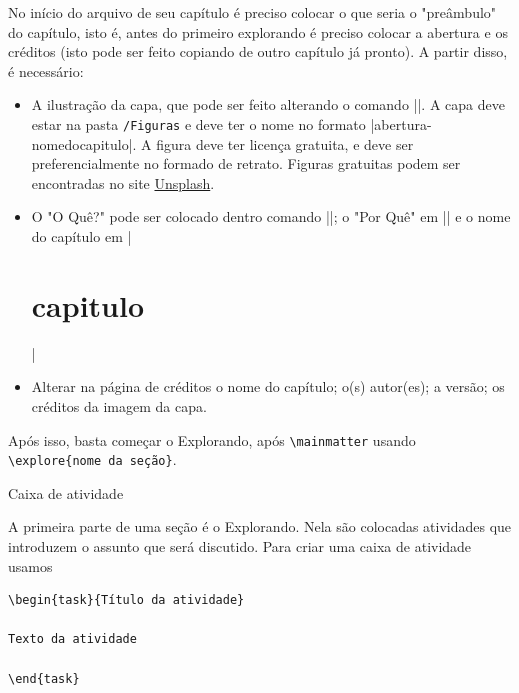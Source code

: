 No início do arquivo de seu capítulo é preciso colocar o que seria o "preâmbulo"{} do capítulo, isto é, antes do primeiro explorando é preciso colocar a abertura e os créditos (isto pode ser feito copiando de outro capítulo já pronto). A partir disso, é necessário:

\begin{itemize}
\item A ilustração da capa, que pode ser feito alterando o comando \spverb|\renewcommand\chapterillustration{./imagemdacapa}|. A capa deve estar na pasta \verb|/Figuras| e deve ter o nome no formato \spverb|abertura-nomedocapitulo|. A figura deve ter licença gratuita, e deve ser preferencialmente no formado de retrato. Figuras gratuitas podem ser encontradas no site \href{https://unsplash.com/}{Unsplash}.

\item O "O Quê?"{} pode ser colocado dentro comando \spverb|\renewcommand\chapterwhat{o que}|; o "Por Quê"{} em \spverb|\renewcommand\chapterbecause{por que}| e o nome do capítulo em \spverb|\chapter{capitulo}|

\item Alterar na página de créditos o nome do capítulo; o(s) autor(es); a versão; os créditos da imagem da capa.
\end{itemize}

Após isso, basta começar o Explorando, após \verb|\mainmatter| usando \verb|\explore{nome da seção}|.

\begin{task}{Caixa de atividade}

A primeira parte de uma seção é o Explorando. Nela são colocadas atividades que introduzem o assunto que será discutido. Para criar uma caixa de atividade usamos
\begin{verbatim}
\begin{task}{Título da atividade}

Texto da atividade

\end{task}
\end{verbatim} 
\end{task}


